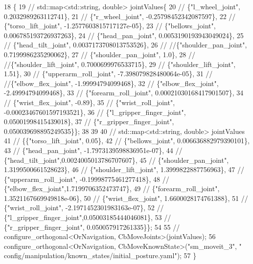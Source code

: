 \begin{DoxyCode}
18     \{
19         \textcolor{comment}{// std::map<std::string, double> jointValues\{}
20         \textcolor{comment}{//     \{"l\_wheel\_joint", 0.2032989263112741\},}
21         \textcolor{comment}{//     \{"r\_wheel\_joint", -0.25798452342087597\},}
22         \textcolor{comment}{//     \{"torso\_lift\_joint", -1.2577603815717127e-05\},}
23         \textcolor{comment}{//     \{"bellows\_joint", 0.006785193726937263\},}
24         \textcolor{comment}{//     \{"head\_pan\_joint", 0.0053190193943049024\},}
25         \textcolor{comment}{//     \{"head\_tilt\_joint", 0.0037173708013753526\},}
26         \textcolor{comment}{//     //\{"shoulder\_pan\_joint", 0.7199986235290062\},}
27         \textcolor{comment}{//     \{"shoulder\_pan\_joint", 1.0\},}
28         \textcolor{comment}{//     //\{"shoulder\_lift\_joint", 0.7000699976533715\},}
29         \textcolor{comment}{//     \{"shoulder\_lift\_joint", 1.51\},}
30         \textcolor{comment}{//     \{"upperarm\_roll\_joint", -7.398079828480064e-05\},}
31         \textcolor{comment}{//     //\{"elbow\_flex\_joint", -1.99994794099468\},}
32         \textcolor{comment}{//     \{"elbow\_flex\_joint", -2.49994794099468\},}
33         \textcolor{comment}{//     \{"forearm\_roll\_joint", 0.00021030168417901507\},}
34         \textcolor{comment}{//     \{"wrist\_flex\_joint", -0.89\},}
35         \textcolor{comment}{//     \{"wrist\_roll\_joint", -0.00023467601597193521\},}
36         \textcolor{comment}{//     \{"l\_gripper\_finger\_joint", 0.05001998415439018\},}
37         \textcolor{comment}{//     \{"r\_gripper\_finger\_joint", 0.050039698895249535\}\};}
38 
39 
40     \textcolor{comment}{//  std::map<std::string, double> jointValues}
41     \textcolor{comment}{//     \{\{"torso\_lift\_joint", 0.05\},}
42     \textcolor{comment}{//      \{"bellows\_joint", 0.006636882979390101\},}
43     \textcolor{comment}{//      \{"head\_pan\_joint", -1.7973139598836951e-07\},}
44     \textcolor{comment}{//      \{"head\_tilt\_joint",0.0024005013786707607\},}
45     \textcolor{comment}{//      \{"shoulder\_pan\_joint", 1.3199500661528623\},}
46     \textcolor{comment}{//      \{"shoulder\_lift\_joint", 1.3999822887756963\},}
47     \textcolor{comment}{//      \{"upperarm\_roll\_joint", -0.19998775461277418\},}
48     \textcolor{comment}{//      \{"elbow\_flex\_joint",1.7199706352473747\},}
49     \textcolor{comment}{//      \{"forearm\_roll\_joint", 1.3521167669949818e-06\},}
50     \textcolor{comment}{//      \{"wrist\_flex\_joint", 1.6600028174761388\},}
51     \textcolor{comment}{//      \{"wrist\_roll\_joint", -2.1971452301983163e-07\},}
52     \textcolor{comment}{//      \{"l\_gripper\_finger\_joint",0.05003185444046081\},}
53     \textcolor{comment}{//      \{"r\_gripper\_finger\_joint", 0.050057917261335\}\};}
54 
55       \textcolor{comment}{//  configure\_orthogonal<OrNavigation, CbMoveJoints>(jointValues);}
56         configure\_orthogonal<OrNavigation, CbMoveKnownState>(\textcolor{stringliteral}{"sm\_moveit\_3"}, \textcolor{stringliteral}{"
      config/manipulation/known\_states/initial\_posture.yaml"});
57     \}
\end{DoxyCode}


